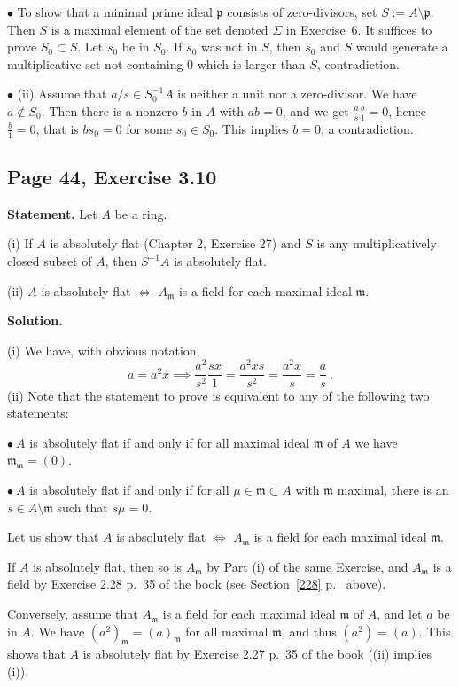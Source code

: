 \documentclass[parskip=half,fontsize=12pt]{scrartcl}%
\newcommand{\mf}{\mathfrak}
\newcommand{\mmm}{\mf m}
\newcommand{\ppp}{\mf p}
\newcommand{\bu}{\bullet}
\begin{document}
$\bu$ To show that a minimal prime ideal $\ppp$ consists of zero-divisors, set $S:=A\setminus\ppp$. Then $S$ is a maximal element of the set denoted $\Sigma$ in Exercise~6. It suffices to prove $S_0\subset S$. Let $s_0$ be in $S_0$. If $s_0$ was not in $S$, then $s_0$ and $S$ would generate a multiplicative set not containing $0$ which is larger than $S$, contradiction. %

$\bu$ (ii) Assume that $a/s\in S_0^{-1}A$ is neither a unit nor a zero-divisor. We have $a\notin S_0$. Then there is a nonzero $b$ in $A$ with $ab=0$, and we get $\frac as\frac b1=0$, hence $\frac b1=0$, that is $bs_0=0$ for some $s_0\in S_0$. This implies $b=0$, a contradiction.

\subsection{Page 44, Exercise 3.10}\label{310}%

\textbf{Statement.} Let $A$ be a ring.

(i) If $A$ is absolutely flat (Chapter 2, Exercise 27) and $S$ is any multiplicatively 
closed subset of $A$, then $S^{-1}A$ is absolutely flat.

(ii) $A$ is absolutely flat $\iff$ $A_\mmm$ is a field for each maximal ideal $\mmm$.

\textbf{Solution.}

(i) We have, with obvious notation, 
$$
a=a^2x\implies\frac{a^2}{s^2}\frac{sx}1=\frac{a^2xs}{s^2}=\frac{a^2x}s=\frac as\ .
$$ 
(ii) Note that the statement to prove is equivalent to any of the following two statements:

$\bu\ A$ is absolutely flat if and only if for all maximal ideal $\mmm$ of $A$ we have $\mmm_\mmm=(0)$.

$\bu\ A$ is absolutely flat if and only if for all $\mu\in\mmm\subset A$ with $\mmm$ maximal, there is an $s\in A\setminus\mmm$ such that $s\mu=0$. 

Let us show that $A$ is absolutely flat $\iff$ $A_\mmm$ is a field for each maximal ideal $\mmm$. 

If $A$ is absolutely flat, then so is $A_\mmm$ by Part (i) of the same Exercise, and $A_\mmm$ is a field by Exercise 2.28 p.~35 of the book (see Section~\ref{228} p.~\pageref{228} above). 

Conversely, assume that $A_\mmm$ is a field for each maximal ideal $\mmm$ of $A$, and let $a$ be in $A$. We have $(a^2)_\mmm=(a)_\mmm$ for all maximal $\mmm$, and thus $(a^2)=(a)$. This shows that $A$ is absolutely flat by Exercise 2.27 p.~35 of the book ((ii) implies (i)).
\end{document}

